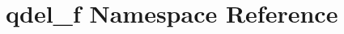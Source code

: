 \hypertarget{namespaceqdel__f}{\section{qdel\-\_\-f Namespace Reference}
\label{namespaceqdel__f}
}
